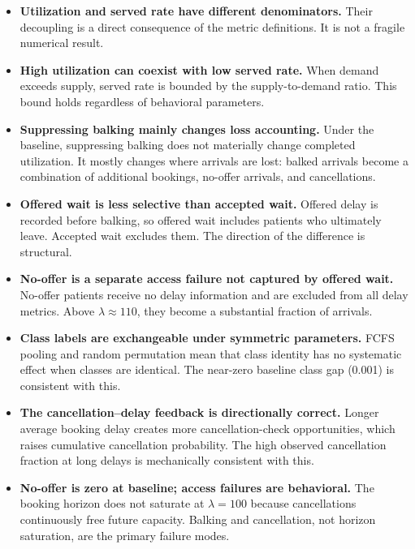 \documentclass[11pt]{article}
\begin{document}
\begin{itemize}[leftmargin=1.5em, itemsep=3pt]
\item \textbf{Utilization and served rate have different denominators.}
Their decoupling is a direct consequence of the metric definitions. It
is not a fragile numerical result.

\item \textbf{High utilization can coexist with low served rate.}
When demand exceeds supply, served rate is bounded by the supply-to-demand
ratio. This bound holds regardless of behavioral parameters.

\item \textbf{Suppressing balking mainly changes loss accounting.}
Under the baseline, suppressing balking does not materially change completed
utilization. It mostly changes where arrivals are lost: balked arrivals become
a combination of additional bookings, no-offer arrivals, and cancellations.

\item \textbf{Offered wait is less selective than accepted wait.}
Offered delay is recorded before balking, so offered wait includes patients
who ultimately leave. Accepted wait excludes them. The direction of the
difference is structural.

\item \textbf{No-offer is a separate access failure not captured by
offered wait.} No-offer patients receive no delay information and are
excluded from all delay metrics. Above $\lambda \approx 110$, they become
a substantial fraction of arrivals.

\item \textbf{Class labels are exchangeable under symmetric parameters.}
FCFS pooling and random permutation mean that class identity has no
systematic effect when classes are identical. The near-zero baseline class
gap (0.001) is consistent with this.

\item \textbf{The cancellation--delay feedback is directionally correct.}
Longer average booking delay creates more cancellation-check opportunities,
which raises cumulative cancellation probability. The high observed
cancellation fraction at long delays is mechanically consistent with this.

\item \textbf{No-offer is zero at baseline; access failures are behavioral.}
The booking horizon does not saturate at $\lambda = 100$ because
cancellations continuously free future capacity. Balking and cancellation,
not horizon saturation, are the primary failure modes.
\end{itemize}
\end{document}
